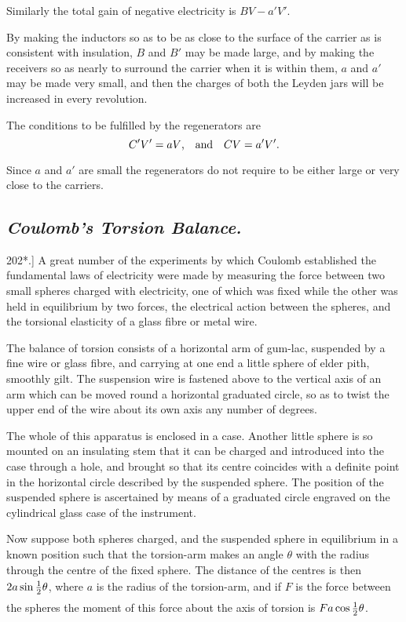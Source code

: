 \documentclass[12pt,oneside]{book}[2021/10/04]
\newcommand{\Heading}{\centering\normalfont}
\newcommand{\Subsection}[1]{\subsection*{\normalsize\Heading\itshape #1}}
\newcommand{\Runhead}[1]{\fancyhead[C]{\iffloatpage{}{\small#1}}}
\newcommand{\article}[1]{\phantomsection \label{art:#1}{#1.]}}
\newcommand{\tstrut}{\rule[-1.5ex]{0pt}{4.2ex}}
\newcommand{\¬}{\hphantom{0}}
\begin{document}
Similarly the total gain of negative electricity is \(BV - a'V'\).

By making the inductors so as to be as close to the surface of
the carrier as is consistent with insulation, \(B\) and \(B'\) may be made
large, and by making the receivers so as nearly to surround the
carrier when it is within them, \(a\) and \(a'\) may be made very small,
and then the charges of both the Leyden jars will be increased in
every revolution.

The conditions to be fulfilled by the regenerators are
\[
C'V'=aV\text{,\quad and\quad}CV = a'V'\text{.}
\]

Since \(a\) and \(a'\) are small the regenerators do not require to be
either large or very close to the carriers.

\Subsection{Coulomb's Torsion Balance.}
\Runhead{TORSION BALANCE.}

\article{202*} A great number of the experiments by which Coulomb
established the fundamental laws of electricity were made by measuring
the force between two small spheres charged with electricity,
one of which was fixed while the other was held in equilibrium by
two forces, the electrical action between the spheres, and the
torsional elasticity of a glass fibre or metal wire.

The balance of torsion consists of a horizontal arm of gum-lac,
suspended by a fine wire or glass fibre, and carrying at one end a
little sphere of elder pith, smoothly gilt. The suspension wire is
fastened above to the vertical axis of an arm which can be moved
round a horizontal graduated circle, so as to twist the upper end
of the wire about its own axis any number of degrees.

The whole of this apparatus is enclosed in a case. Another little
sphere is so mounted on an insulating stem that it can be charged
and introduced into the case through a hole, and brought so that
its centre coincides with a definite point in the horizontal circle
described by the suspended sphere. The position of the suspended
sphere is ascertained by means of a graduated circle engraved on
the cylindrical glass case of the instrument.

Now suppose both spheres charged, and the suspended sphere
in equilibrium in a known position such that the torsion-arm makes
an angle \(\theta\) with the radius through the centre of the fixed sphere.
The distance of the centres is then \(2 a \sin \tstrut\frac{1}{2} \theta\), where \(a\) is the radius
of the torsion-arm, and if \(F\) is the force between the spheres the
moment of this force about the axis of torsion is \(Fa \cos \tstrut\frac{1}{2} \theta\).
\end{document}

